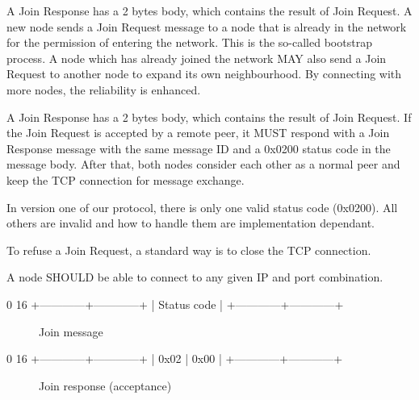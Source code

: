 \documentclass[12pt, a4paper]{article}
\begin{document}
A Join Response has a 2 bytes body, which contains the result of Join Request.
A new node sends a Join Request message to a node that is already in the network for the permission of entering the network.
This is the so-called bootstrap process.
A node which has already joined the network MAY also send a Join Request to another node to expand its own neighbourhood.
By connecting with more nodes, the reliability is enhanced.

A Join Response has a 2 bytes body, which contains the result of Join Request.
If the Join Request is accepted by a remote peer, it MUST respond with a Join Response message with the same message ID and a 0x0200 status code in the message body.
After that, both nodes consider each other as a normal peer and keep the TCP connection for message exchange.

In version one of our protocol, there is only one valid status code (0x0200).
All others are invalid and how to handle them are implementation dependant.

To refuse a Join Request, a standard way is to close the TCP connection.

A node SHOULD be able to connect to any given IP and port combination.

\begin{verbbox}
0                          16
+------------+------------+
|      Status code        |
+------------+------------+
\end{verbbox}

\begin{figure}[h!]
  \centering
  \theverbbox
  \label{joinrequest}
  \caption{Join message}
\end{figure}

\begin{verbbox}
0                          16
+------------+------------+
|    0x02    |    0x00    |
+------------+------------+
\end{verbbox}

\begin{figure}[h!]
  \centering
  \theverbbox
  \label{joinresponse}
  \caption{Join response (acceptance)}
\end{figure}
\end{document}
